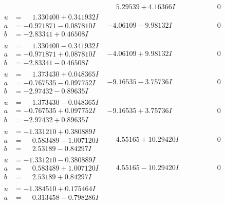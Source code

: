 \documentclass[1p]{elsarticle_modified}
\theoremstyle{definition}
\begin{document}
$$\begin{array}{c|c|c}
 & \phantom{-}5.29539 + 4.16366 I & \phantom{-0.000000 } 0 \\ \hline\begin{aligned}
u &= \phantom{-}1.330400 + 0.341932 I \\
a &= -0.971871 - 0.087810 I \\
b &= -2.83341 + 0.46508 I\end{aligned}
 & -4.06109 - 9.98132 I & \phantom{-0.000000 } 0 \\ \hline\begin{aligned}
u &= \phantom{-}1.330400 - 0.341932 I \\
a &= -0.971871 + 0.087810 I \\
b &= -2.83341 - 0.46508 I\end{aligned}
 & -4.06109 + 9.98132 I & \phantom{-0.000000 } 0 \\ \hline\begin{aligned}
u &= \phantom{-}1.373430 + 0.048365 I \\
a &= -0.767535 - 0.097752 I \\
b &= -2.97432 - 0.89635 I\end{aligned}
 & -9.16535 - 3.75736 I & \phantom{-0.000000 } 0 \\ \hline\begin{aligned}
u &= \phantom{-}1.373430 - 0.048365 I \\
a &= -0.767535 + 0.097752 I \\
b &= -2.97432 + 0.89635 I\end{aligned}
 & -9.16535 + 3.75736 I & \phantom{-0.000000 } 0 \\ \hline\begin{aligned}
u &= -1.331210 + 0.380889 I \\
a &= \phantom{-}0.583489 - 1.007120 I \\
b &= \phantom{-}2.53189 - 0.84297 I\end{aligned}
 & \phantom{-}4.55165 + 10.29420 I & \phantom{-0.000000 } 0 \\ \hline\begin{aligned}
u &= -1.331210 - 0.380889 I \\
a &= \phantom{-}0.583489 + 1.007120 I \\
b &= \phantom{-}2.53189 + 0.84297 I\end{aligned}
 & \phantom{-}4.55165 - 10.29420 I & \phantom{-0.000000 } 0 \\ \hline\begin{aligned}
u &= -1.384510 + 0.175464 I \\
a &= \phantom{-}0.313458 - 0.798286 I \\

\end{aligned}
\end{array}$$
\end{document}
